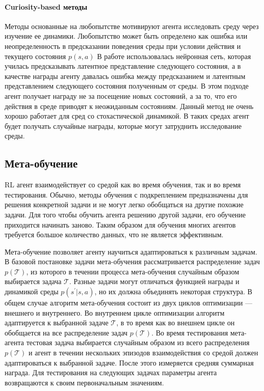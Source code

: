 \paragraph{Curiosity-based методы} Методы основанные на любопытстве мотивируют агента исследовать среду через изучение ее динамики. Любопытство может быть определено как ошибка или неопределенность в предсказании поведения среды при условии действия и текущего состояния $p(s, a)$ \cite{stadie2015incentivizing, pathak2017curiosity} В работе \cite{pathak2017curiosity} использовалась нейронная сеть, которая училась предсказывать латентное представление следующего состояния, а в качестве награды агенту давалась ошибка между предсказанием и латентным представлением следующего состояния полученным от среды. В этом подходе агент получает награду не за посещение новых состояний, а за то, что его действия в среде приводят к неожиданным состояниям. Данный метод не очень хорошо работает для сред со стохастической динамикой. В таких средах агент будет получать случайные награды, которые могут затруднить исследование среды. 


\subsection{Мета-обучение}

RL агент взаимодействует со средой как во время обучения, так и во время тестирования. Обычно, методы обучения с подкреплением предназначены для решения конкретной задачи и не могут легко обобщаться на другие похожие задачи. Для того чтобы обучить агента решению другой задачи, его обучение приходится начинать заново. Таким образом для обучения многих агентов требуется большое количество данных, что не является эффективным.

Мета-обучение позволяет агенту научиться адаптироваться к различным задачам. В базовой постановке задачи мета-обучения рассматривается распределение задач $p(\mathcal{T})$, из которого в течении процесса мета-обучения случайным образом выбирается задача $\mathcal{T}$. Разные задачи могут отличаться функцией награды и динамикой среды $p(s^{\prime}|s, a)$, но их должна объединять некоторая структура.
В общем случае алгоритм мета-обучения состоит из двух циклов оптимизации --- внешнего и внутреннего. 
Во внутреннем цикле оптимизации алгоритм адаптируется к выбранной задаче $\mathcal{T}$, в то время как во внешнем цикле он обобщается на все распределение задач $p(\mathcal{T})$. Во время тестирования мета-агента тестовая задача выбирается случайным образом из всего распределения $p(\mathcal{T})$ и агент в течении нескольких эпизодов взаимодействия со средой должен адаптироваться к выбранной задаче. После этого измеряется средняя суммарная награда. Для тестирования на следующих задачах параметры агента возвращаются к своим первоначальным значениям.

